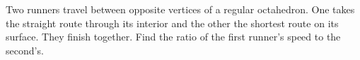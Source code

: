 Two runners travel between opposite vertices of a regular octahedron. One takes the straight route through its interior and the other the shortest route on its surface. They finish together. Find the ratio of the first runner's speed to the second's.

